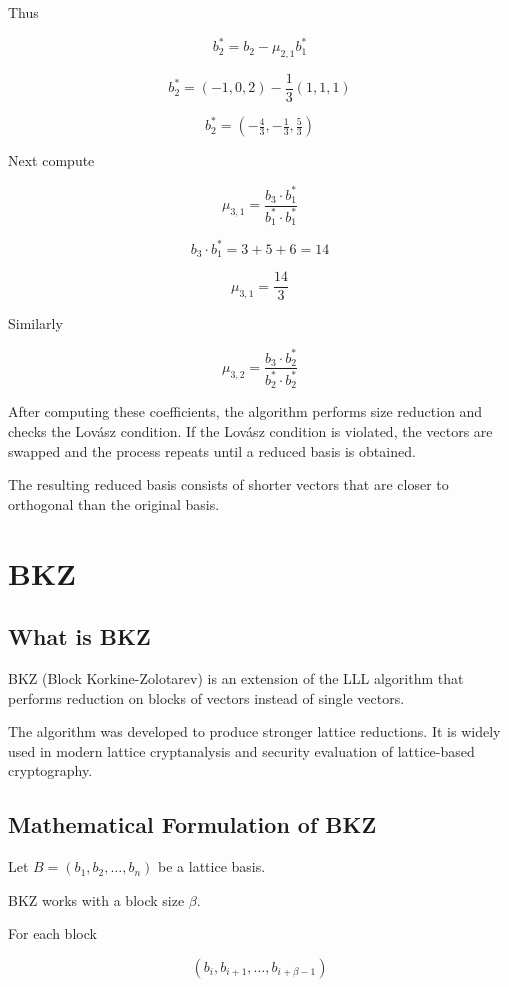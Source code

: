 \documentclass[12pt, a4paper]{article}
\theoremstyle{definition}
\theoremstyle{plain}
\begin{document}
Thus

\[
b_2^* = b_2-\mu_{2,1}b_1^*
\]

\[
b_2^*=(-1,0,2)-\frac13(1,1,1)
\]

\[
b_2^*=(-\tfrac43,-\tfrac13,\tfrac53)
\]

Next compute

\[
\mu_{3,1}=\frac{b_3\cdot b_1^*}{b_1^*\cdot b_1^*}
\]

\[
b_3\cdot b_1^* = 3+5+6=14
\]

\[
\mu_{3,1}=\frac{14}{3}
\]

Similarly

\[
\mu_{3,2}=\frac{b_3\cdot b_2^*}{b_2^*\cdot b_2^*}
\]

After computing these coefficients, the algorithm performs size reduction and checks the Lovász condition. If the Lovász condition is violated, the vectors are swapped and the process repeats until a reduced basis is obtained.

The resulting reduced basis consists of shorter vectors that are closer to orthogonal than the original basis.

\section{BKZ}

\subsection{What is BKZ}

BKZ (Block Korkine-Zolotarev) is an extension of the LLL algorithm that performs reduction on blocks of vectors instead of single vectors.

The algorithm was developed to produce stronger lattice reductions. It is widely used in modern lattice cryptanalysis and security evaluation of lattice-based cryptography.

\subsection{Mathematical Formulation of BKZ}

Let $B=(b_1,b_2,\dots,b_n)$ be a lattice basis.

BKZ works with a block size $\beta$.

For each block

\[
(b_i,b_{i+1},\dots,b_{i+\beta-1})
\]
\end{document}
